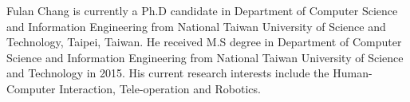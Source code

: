 Fulan Chang is currently a Ph.D candidate 
in Department of Computer Science and Information Engineering 
from National Taiwan University of Science and Technology, Taipei, Taiwan. 
He received M.S degree in Department of Computer Science  and Information Engineering 
from National Taiwan University of Science and Technology in 2015. 
His current research interests include the Human-Computer Interaction, 
Tele-operation and Robotics. 